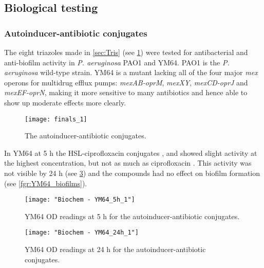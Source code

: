 \subsection{Biological testing\label{sec:bio1}}

\subsubsection{Autoinducer-antibiotic conjugates}

The eight triazoles made in \ref{sec:Tris} (see \ref{fgr:finals_1}) were tested for antibacterial and anti-biofilm activity in \textit{P. aeruginosa} PAO1\cite{Stover2000} and YM64\cite{Morita2001}.
PAO1 is the \textit{P. aeruginosa} wild-type strain.
YM64 is a mutant lacking all of the four major \textit{mex} operons for multidrug efflux pumps: \textit{mexAB-oprM}, \textit{mexXY}, \textit{mexCD-oprJ} and \textit{mexEF-oprN}, making it more sensitive to many antibiotics and hence able to show up moderate effects more clearly.

\begin{figure}[H]
	\begin{center}
		\texttt{[image: finals\_1]}
		\caption{The autoinducer-antibiotic conjugates.
 		\label{fgr:finals_1}}
	\end{center}
\end{figure}


In YM64 at 5 h the HSL-ciprofloxacin conjugates ,  and  showed slight activity at the highest concentration, but not as much as ciprofloxacin .
This activity was not visible by 24 h (see \ref{fgr:YM64_24h}) and the compounds had no effect on biofilm formation (see \ref{fgr:YM64_biofilms}).



\begin{figure}[H]
	\begin{center}
		\texttt{[image: "Biochem - YM64\_5h\_1"]}
		\caption{YM64 OD readings at 5 h for the autoinducer-antibiotic conjugates.\label{fgr:YM64_5h}}
	\end{center}
\end{figure}
\begin{figure}[H]
	\begin{center}
		\texttt{[image: "Biochem - YM64\_24h\_1"]}
		\caption{YM64 OD readings at 24 h for the autoinducer-antibiotic conjugates.\label{fgr:YM64_24h}}
	\end{center}
\end{figure}

